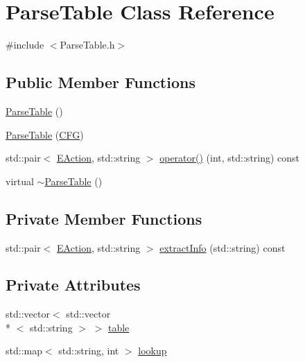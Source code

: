 \hypertarget{classParseTable}{\section{Parse\-Table Class Reference}
\label{classParseTable}
}


{\ttfamily \#include $<$Parse\-Table.\-h$>$}

\subsection*{Public Member Functions}
\begin{DoxyCompactItemize}
\item 
\hyperlink{classParseTable_acacf41ffea967138a7eb200a1d03c0bf}{Parse\-Table} ()
\item 
\hyperlink{classParseTable_a71107a2b7d2b83142a31d08d9e960fee}{Parse\-Table} (\hyperlink{classCFG}{C\-F\-G})
\item 
std\-::pair$<$ \hyperlink{ParseTable_8h_a81d4868b129e5f45325894085a36a8a5}{E\-Action}, std\-::string $>$ \hyperlink{classParseTable_a276cf2fa3182cff81da31ce69c26a30c}{operator()} (int, std\-::string) const 
\item 
virtual \hyperlink{classParseTable_aa3c8f1c8313c216e39388ec0bd64afc6}{$\sim$\-Parse\-Table} ()
\end{DoxyCompactItemize}
\subsection*{Private Member Functions}
\begin{DoxyCompactItemize}
\item 
std\-::pair$<$ \hyperlink{ParseTable_8h_a81d4868b129e5f45325894085a36a8a5}{E\-Action}, std\-::string $>$ \hyperlink{classParseTable_a67d59fa53fbc3136cc8ad6e20c7edf87}{extract\-Info} (std\-::string) const 
\end{DoxyCompactItemize}
\subsection*{Private Attributes}
\begin{DoxyCompactItemize}
\item 
std\-::vector$<$ std\-::vector\\*
$<$ std\-::string $>$ $>$ \hyperlink{classParseTable_a0dbd87ee0d018de6bb990e1ffd8ac26d}{table}
\item 
std\-::map$<$ std\-::string, int $>$ \hyperlink{classParseTable_ac91766c673d5b534e370e31eb71f6604}{lookup}
\end{DoxyCompactItemize}



